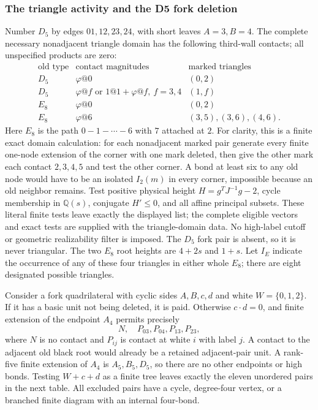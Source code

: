 \documentclass[11pt]{article}
\begin{document}
\subsubsection{The triangle activity and the D5 fork deletion}
Number $D_5$ by edges $01,12,23,24$, with short leaves $A=3,B=4$.
The complete necessary nonadjacent triangle domain has the following
third-wall contacts; all unspecified products are zero:
\[
\begin{array}{c|c|c}
\text{old type}&\text{contact magnitudes}&\text{marked triangles}\\ \hline
D_5&\varphi@0&(0,2)\\
D_5&\varphi@f\text{ or }1@1+\varphi@f,\ f=3,4&(1,f)\\
E_8&\varphi@0&(0,2)\\
E_8&\varphi@6&(3,5),(3,6),(4,6).
\end{array}
\]
Here $E_8$ is the path $0-1-\cdots-6$ with $7$ attached at $2$.
For clarity, this is a finite exact domain calculation: for each
nonadjacent marked pair generate every finite one-node extension of
the corner with one mark deleted, then give the other mark each
contact $2,3,4,5$ and test the other corner. A bond at least six to
any old node would have to be an isolated $I_2(m)$ in every corner,
impossible because an old neighbor remains. Test positive physical
height $H=g^TJ^{-1}g-2$, cycle membership in $\mathbb Q(s)$,
conjugate $H'\le0$, and all affine principal subsets. These literal
finite tests leave exactly the displayed list; the complete eligible
vectors and exact tests are supplied with the triangle-domain data.
No high-label cutoff or geometric realizability filter is imposed.
The $D_5$ fork pair is absent, so it is never triangular.
The two $E_8$ root heights are $4+2s$ and $1+s$.
Let $I_E$ indicate the occurrence of any of these four triangles in
either whole $E_8$; there are eight designated possible triangles.

Consider a fork quadrilateral with cyclic sides $A,B,c,d$ and white
$W=\{0,1,2\}$. If it has a basic unit not being deleted, it is paid.
Otherwise $c\cdot d=0$, and finite extension of the endpoint $A_4$
permits precisely
\[
 N,\quad P_{03},P_{04},P_{13},P_{23},
\]
where $N$ is no contact and $P_{ij}$ is contact at white $i$ with
label $j$. A contact to the adjacent old black root would already
be a retained adjacent-pair unit. A rank-five finite extension of
$A_4$ is $A_5,B_5,D_5$, so there are no other endpoints or high bonds.
Testing $W+c+d$ as a finite tree leaves exactly the eleven unordered
pairs in the next table. All excluded pairs have a cycle, degree-four
vertex, or a branched finite diagram with an internal four-bond.
\end{document}
